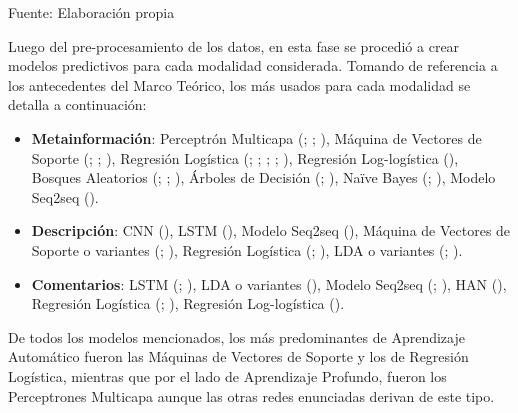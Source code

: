 
\begin{flushleft}	%
	\small Fuente: Elaboración propia
\end{flushleft}

Luego del pre-procesamiento de los datos, en esta fase se procedió a crear modelos predictivos para cada modalidad considerada. Tomando de referencia a los antecedentes del Marco Teórico, los más usados para cada modalidad se detalla a continuación:
\begin{itemize}
	\item \textbf{Metainformación}: Perceptrón Multicapa (\cite{pr_kamath2018suplearn}; \cite{pr_yu2018deeplearning}; \cite{pr_cheng2019deeplearning}), Máquina de Vectores de Soporte (\cite{pr_chen2013kickpredict}; \cite{pr_beckwith2016predcrowd}; \cite{pr_sawhney2016usingLT}), Regresión Logística (\cite{pr_mitra2014phrases}; \cite{pr_zhou2015projectdesc}; \cite{pr_beckwith2016predcrowd}; \cite{pr_li2016predcrowd}; \cite{pr_kaur2017socmedcrowd}), Regresión Log-logística (\cite{pr_li2016predcrowd}), Bosques Aleatorios (\cite{pr_chen2015predcrowd}; \cite{pr_yuan2016textanalytics}; \cite{pr_kamath2018suplearn}), Árboles de Decisión (\cite{pr_beckwith2016predcrowd}; \cite{pr_kamath2018suplearn}), Naïve Bayes (\cite{pr_beckwith2016predcrowd}; \cite{pr_kamath2018suplearn}), Modelo Seq2seq (\cite{pr_jin2019dayssuccess}).
	\item \textbf{Descripción}: CNN (\cite{pr_cheng2019deeplearning}), LSTM (\cite{pr_jin2019dayssuccess}), Modelo Seq2seq (\cite{pr_lee2018contentDL}), Máquina de Vectores de Soporte o variantes (\cite{pr_sawhney2016usingLT}; \cite{pr_chen2019keywords_crowdfunding}), Regresión Logística (\cite{pr_mitra2014phrases}; \cite{pr_zhou2015projectdesc}), LDA o variantes (\cite{pr_yuan2016textanalytics}; \cite{pr_sawhney2016usingLT}).
	\item \textbf{Comentarios}: LSTM (\cite{pr_jin2019dayssuccess}; \cite{pr_shafqat2019topicpredictions}), LDA o variantes (\cite{pr_shafqat2019topicpredictions}), Modelo Seq2seq (\cite{pr_lee2018contentDL}; \cite{pr_jin2019dayssuccess}), HAN (\citeauthor{pr_lee2018contentDL}), Regresión Logística (\cite{pr_li2016predcrowd}; \cite{pr_kaur2017socmedcrowd}), Regresión Log-logística (\cite{pr_li2016predcrowd}).
\end{itemize}

De todos los modelos mencionados, los más predominantes de Aprendizaje Automático fueron las Máquinas de Vectores de Soporte y los de Regresión Logística, mientras que por el lado de Aprendizaje Profundo, fueron los Perceptrones Multicapa aunque las otras redes enunciadas derivan de este tipo.

